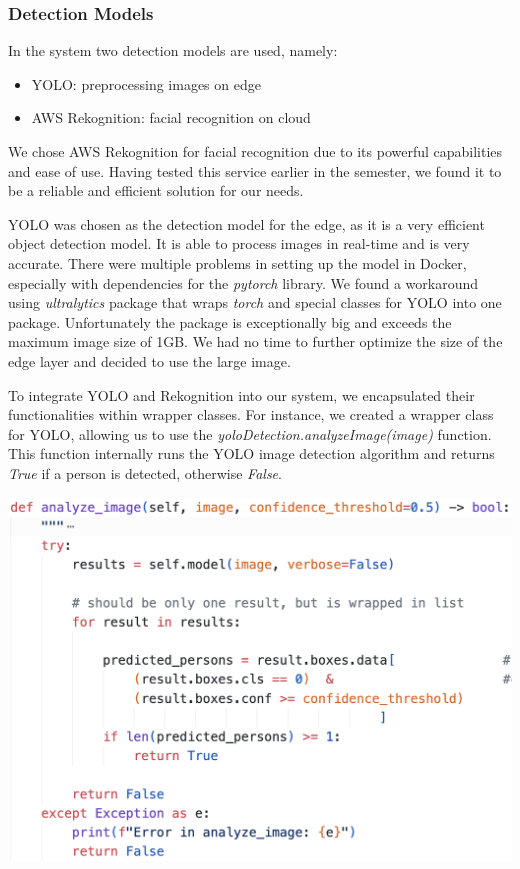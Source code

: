 \documentclass[conference]{IEEEtran}
\begin{document}
\subsubsection{Detection Models}
In the system two detection models are used, namely: 
\begin{itemize}
\item YOLO: preprocessing images on edge
\item AWS Rekognition: facial recognition on cloud
\end{itemize}

\hfill \break

We chose AWS Rekognition for facial recognition due to its powerful capabilities and ease of use. Having tested this service earlier in the semester, we found it to be a reliable and efficient solution for our needs.

YOLO was chosen as the detection model for the edge, as it is a very efficient object detection model. It is able to process images in real-time and is very accurate. There were multiple problems in setting up the model in Docker, especially with dependencies for the \textit{pytorch} library. We found a workaround using \textit{ultralytics} package that wraps \textit{torch} and special classes for YOLO into one package. Unfortunately the package is exceptionally big and exceeds the maximum image size of 1GB. We had no time to further optimize the size of the edge layer and decided to use the large image. 

To integrate YOLO and Rekognition into our system, we encapsulated their functionalities within wrapper classes. For instance, we created a wrapper class for YOLO, allowing us to use the \textit{yoloDetection.analyzeImage(image)} function. This function internally runs the YOLO image detection algorithm and returns \textit{True} if a person is detected, otherwise \textit{False}.

\begin{center}
\includegraphics[width=1\linewidth]{res/analyze_image-function.png}
\end{center}
\end{document}

